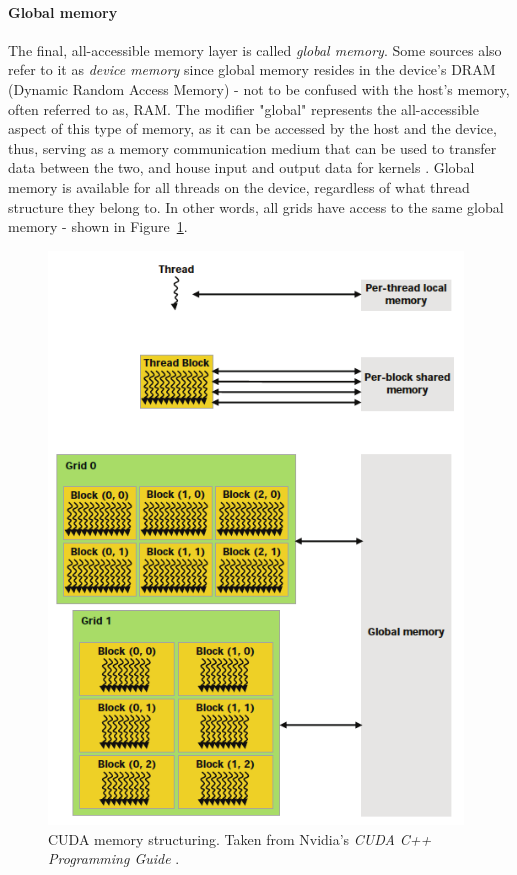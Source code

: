 \paragraph{Global memory}\label{Paragraph:theory-CUDA-memory-management-global-memory}
The final, all-accessible memory layer is called \textit{global memory}. Some sources also refer to it as \textit{device memory} since global memory resides in the device's DRAM (Dynamic Random Access Memory) - not to be confused with the host's memory, often referred to as, RAM. The modifier "global" represents the all-accessible aspect of this type of memory, as it can be accessed by the host and the device, thus, serving as a memory communication medium that can be used to transfer data between the two, and house input and output data for kernels \cite{Harris7January2013}. Global memory is available for all threads on the device, regardless of what thread structure they belong to. In other words, all grids have access to the same global memory - shown in Figure~\ref{Figure:theory-CUDA-memory-management}.

\begin{figure}[ht!]
	\centering
	\includegraphics[width=11cm, keepaspectratio]{images/ch1/CUDA_memory_management.png}
	\caption{CUDA memory structuring. Taken from Nvidia's \emph{CUDA C++ Programming Guide} \cite{NVIDIAMay2022}.}
	\label{Figure:theory-CUDA-memory-management}
\end{figure}


